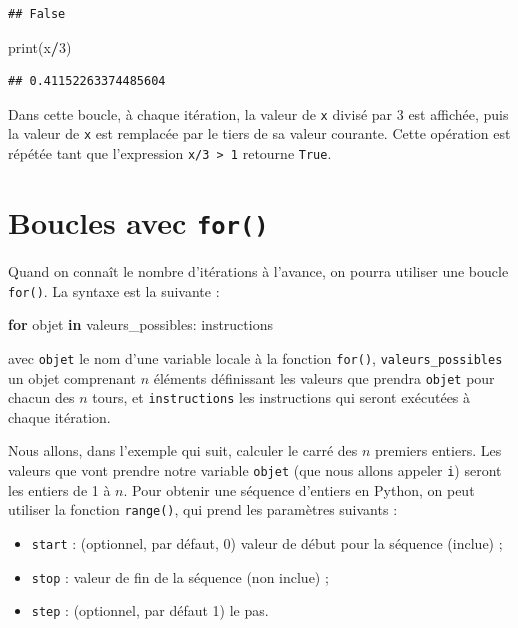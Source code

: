 \documentclass[12pt,]{book}
\newenvironment{Shaded}{\begin{snugshade}}{\end{snugshade}}
\newcommand{\KeywordTok}[1]{\textcolor[rgb]{0.13,0.29,0.53}{\textbf{#1}}}
\newcommand{\DecValTok}[1]{\textcolor[rgb]{0.00,0.00,0.81}{#1}}
\newcommand{\ControlFlowTok}[1]{\textcolor[rgb]{0.13,0.29,0.53}{\textbf{#1}}}
\newcommand{\OperatorTok}[1]{\textcolor[rgb]{0.81,0.36,0.00}{\textbf{#1}}}
\newcommand{\BuiltInTok}[1]{#1}
\newcommand{\NormalTok}[1]{#1}
\providecommand{\tightlist}{%
  \setlength{\itemsep}{0pt}\setlength{\parskip}{0pt}}
\numberwithin{equation}{section}
\numberwithin{countremarque}{section}
\begin{document}
\begin{lstlisting}
## False
\end{lstlisting}

\begin{Shaded}
\begin{Highlighting}[]
\BuiltInTok{print}\NormalTok{(x}\OperatorTok{/}\DecValTok{3}\NormalTok{)}
\end{Highlighting}
\end{Shaded}

\begin{lstlisting}
## 0.41152263374485604
\end{lstlisting}

Dans cette boucle, à chaque itération, la valeur de \texttt{x} divisé
par 3 est affichée, puis la valeur de \texttt{x} est remplacée par le
tiers de sa valeur courante. Cette opération est répétée tant que
l'expression \texttt{x/3\ \textgreater{}\ 1} retourne \texttt{True}.

\section{\texorpdfstring{Boucles avec
\texttt{for()}}{Boucles avec for()}}\label{boucles-avec-for}

Quand on connaît le nombre d'itérations à l'avance, on pourra utiliser
une boucle \texttt{for()}. La syntaxe est la suivante :

\begin{Shaded}
\begin{Highlighting}[]
\ControlFlowTok{for}\NormalTok{ objet }\KeywordTok{in}\NormalTok{ valeurs_possibles:}
\NormalTok{  instructions}
\end{Highlighting}
\end{Shaded}

avec \texttt{objet} le nom d'une variable locale à la fonction
\texttt{for()}, \texttt{valeurs\_possibles} un objet comprenant \(n\)
éléments définissant les valeurs que prendra \texttt{objet} pour chacun
des \(n\) tours, et \texttt{instructions} les instructions qui seront
exécutées à chaque itération.

Nous allons, dans l'exemple qui suit, calculer le carré des \(n\)
premiers entiers. Les valeurs que vont prendre notre variable
\texttt{objet} (que nous allons appeler \texttt{i}) seront les entiers
de 1 à \(n\). Pour obtenir une séquence d'entiers en Python, on peut
utiliser la fonction \texttt{range()}, qui prend les paramètres suivants
:

\begin{itemize}
\tightlist
\item
  \texttt{start} : (optionnel, par défaut, 0) valeur de début pour la
  séquence (inclue) ;
\item
  \texttt{stop} : valeur de fin de la séquence (non inclue) ;
\item
  \texttt{step} : (optionnel, par défaut 1) le pas.
\end{itemize}
\end{document}
